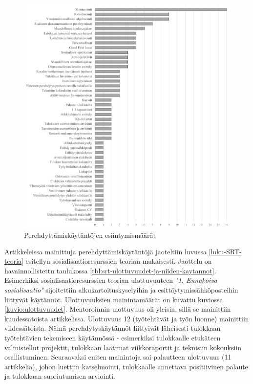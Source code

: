 \documentclass[utf8]{gradu3}
\begin{document}
\begin{figure}[h]
    \centering
    \includegraphics[width=14cm]{media/45-kaytannot.png}
    \caption{Perehdyttämiskäytäntöjen esiintymismäärät}
    \label{kuvio:kaytannot}
\end{figure}

Artikkeleissa mainittuja perehdyttämiskäytäntöjä jaoteltiin luvussa \ref{luku-SRT-teoria} esitellyn sosialisaatioresurssien teorian mukaisesti. Jaottelu on havainnollistettu taulukossa \ref{tbl:srt-ulottuvuudet-ja-niiden-kaytannot}. Esimerkiksi sosialisaatioresurssien teorian ulottuvuuteen \textit{"1. Ennakoiva sosialisaatio"} sijoitettiin alkukartoituskyselyihin ja esittäytymissähköposteihin liittyvät käytännöt. Ulottuvuuksien mainintamäärät on kuvattu kuviossa \ref{kuvio:ulottuvuudet}. Mentoroinnin ulottuvuus oli yleisin, sillä se mainittiin kuudessatoista artikkelissa. Ulottuvuus 12 (työtehtävät ja työn luonne) mainittiin viidessätoista. Nämä perehdytyskäytännöt liittyivät läheisesti tulokkaan työtehtävien tekemiseen käytännössä - esimerkiksi tulokkaalle etukäteen valmistellut projektit, tulokkaan laatimat viikkoraportit ja teknisiin kokouksiin osallistuminen. Seuraavaksi eniten mainintoja sai palautteen ulottuvuus (11 artikkelia), johon luettiin katselmointi, tulokkaalle annettava positiivinen palaute ja tulokkaan suoriutumisen arviointi.
\end{document}
